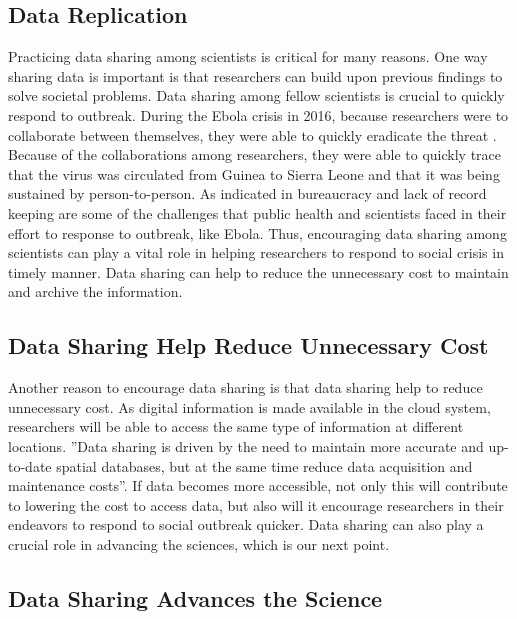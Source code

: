 \documentclass[sigconf]{acmart}
\begin{document}
\subsection{Data Replication}

Practicing data sharing among scientists is critical for many reasons. One way sharing data is important is that researchers can build upon previous findings to solve societal problems. Data sharing among fellow scientists is crucial to quickly respond to outbreak. During the Ebola crisis in 2016, because researchers were to collaborate between themselves, they were able to quickly eradicate the threat \cite{yozwiak2015data}. Because of the collaborations among researchers, they were able to quickly trace that the virus was circulated from Guinea to Sierra Leone and that it was being sustained by person-to-person. As indicated in \cite{vogel2014delays} bureaucracy and lack of record keeping are some of the challenges that public health and scientists faced in their effort to response to outbreak, like Ebola. Thus, encouraging data sharing among scientists can play a vital role in helping researchers to respond to social crisis in timely manner. Data sharing can help to reduce the unnecessary cost to maintain and archive the information. 

\subsection{Data Sharing Help Reduce Unnecessary Cost
}

Another reason to encourage data sharing is that data sharing help to reduce unnecessary cost. As digital information is made available in the cloud system, researchers will be able to access the same type of information at different locations.  ''Data sharing is driven by the need to maintain more accurate and up-to-date spatial databases, but at the same time reduce data acquisition and maintenance costs''\cite{stoakes2005data}. If data becomes more accessible, not only this will contribute to lowering the cost to access data, but also will it encourage researchers in their endeavors to respond to social outbreak quicker. Data sharing can also play a crucial role in advancing the sciences, which is our next point. 

\subsection{Data Sharing Advances the Science}
\end{document}
